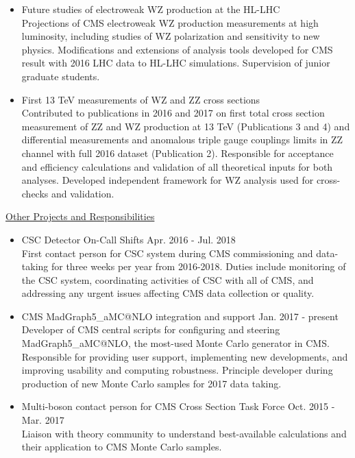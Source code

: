 \documentclass[10pt]{res} %
\begin{document}
\begin{resume}
\begin{itemize}
  \item{Future studies of electroweak WZ production at the HL-LHC} \\
    Projections of CMS electroweak WZ production measurements at high luminosity, including studies of
    WZ polarization and sensitivity to new physics. 
    Modifications and extensions of analysis tools developed for CMS result with 2016 LHC data to 
    HL-LHC simulations. Supervision of junior graduate students.

  \item{First 13 TeV measurements of WZ and ZZ cross sections} \\
    Contributed to publications in 2016 and 2017 on first total cross section measurement 
    of ZZ and WZ production at 13 TeV (Publications 3 and 4) and differential measurements and anomalous
    triple gauge couplings limits in ZZ channel
    with full 2016 dataset (Publication 2). 
    Responsible for acceptance
    and efficiency calculations and validation of all theoretical inputs for both analyses. 
    Developed independent framework for WZ analysis used for cross-checks and validation.

\end{itemize}

\underline{Other Projects and Responsibilities}
\vspace{2mm}
\begin{itemize}
  \item CSC Detector On-Call Shifts \hfill{Apr. 2016 - Jul. 2018} \\
    First contact person for CSC system during CMS commissioning and data-taking for three weeks per year
    from 2016-2018. Duties include monitoring of the CSC system, coordinating activities of CSC with all of CMS, 
    and addressing any urgent issues affecting CMS data collection or quality.

  \item CMS MadGraph5\_aMC@NLO integration and support \hfill{Jan. 2017 - present} \\
    Developer of CMS central scripts
    for configuring and steering MadGraph5\_aMC@NLO, the most-used Monte Carlo generator in CMS. Responsible for 
    providing user support, implementing new developments, 
    and improving usability and computing robustness. Principle developer during production
    of new Monte Carlo samples for 2017 data taking.

  \item Multi-boson contact person for CMS Cross Section Task Force \hfill{Oct. 2015 - Mar. 2017} \\
    Liaison with theory community to understand best-available calculations and 
    their application to CMS Monte Carlo samples. 


\end{itemize}
\end{resume}
\end{document}
